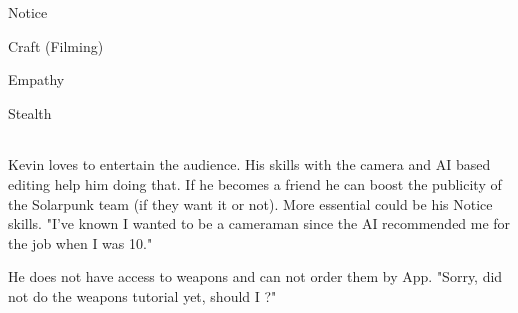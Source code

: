 \begin{npcBox}[title=Kevin\, Camera]

    \begin{aspects}
    \item {}
    \item {}    
    \end{aspects}
    
    \begin{skills}
    \item {} Notice
    \item {} Craft (Filming)
    \item {} Empathy
    \item {} Stealth
    \end{skills}
    
    \begin{stunts}
    \item {}
    \end{stunts}
    
    \begin{stressSection}
    \end{stressSection}
    \begin{tabularx}{\textwidth}{ XX }
    \end{tabularx}
    
    \begin{consequences}
    \item {}
    \item {}
    \item {}
    \end{consequences}
    
    \begin{npcDescription}
    Kevin loves to entertain the audience. His skills with the camera and AI based editing help him doing that. If he becomes a friend he can boost the publicity of the Solarpunk team (if they want it or not). More essential could be his Notice skills.
    "I've known I wanted to be a cameraman since the AI recommended me for the job when I was 10."


    He does not have access to weapons and can not order them by App. "Sorry, did not do the weapons tutorial yet, should I ?"

    \end{npcDescription}
    
\end{npcBox}



